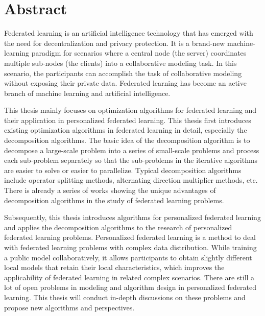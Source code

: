 \chapter*{{Abstract}}%
 \headheight=15.24pt%
 \headheight=15.24pt%


Federated learning is an artificial intelligence technology that has emerged with the need for decentralization and privacy protection. It is a brand-new machine-learning paradigm for scenarios where a central node (the server) coordinates multiple sub-nodes (the clients) into a collaborative modeling task. In this scenario, the participants can accomplish the task of collaborative modeling without exposing their private data. Federated learning has become an active branch of machine learning and artificial intelligence.

This thesis mainly focuses on optimization algorithms for federated learning and their application in personalized federated learning. This thesis first introduces existing optimization algorithms in federated learning in detail, especially the decomposition algorithms. The basic idea of the decomposition algorithm is to decompose a large-scale problem into a series of small-scale problems and process each sub-problem separately so that the sub-problems in the iterative algorithms are easier to solve or easier to parallelize. Typical decomposition algorithms include operator splitting methods, alternating direction multiplier methods, etc. There is already a series of works showing the unique advantages of decomposition algorithms in the study of federated learning problems.

Subsequently, this thesis introduces algorithms for personalized federated learning and applies the decomposition algorithms to the research of personalized federated learning problems. Personalized federated learning is a method to deal with federated learning problems with complex data distribution. While training a public model collaboratively, it allows participants to obtain slightly different local models that retain their local characteristics, which improves the applicability of federated learning in related complex scenarios. There are still a lot of open problems in modeling and algorithm design in personalized federated learning. This thesis will conduct in-depth discussions on these problems and propose new algorithms and perspectives.

